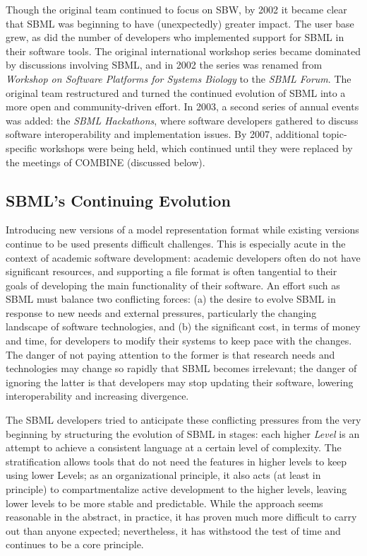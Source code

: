 Though the original team continued to focus on SBW, by 2002 it became clear that SBML was beginning to have (unexpectedly) greater impact.  The user base grew, as did the number of developers who implemented support for SBML in their software tools.  The original international workshop series became dominated by discussions involving SBML, and in 2002 the series was renamed from \emph{Workshop on Software Platforms for Systems Biology} to the \emph{SBML Forum}.  The original team restructured and turned the continued evolution of SBML into a more open and community-driven effort.  In 2003, a second series of annual events was added: the \emph{SBML Hackathons}, where software developers gathered to discuss software interoperability and implementation issues.  By 2007, additional topic-specific workshops were being held, which continued until they were replaced by the meetings of COMBINE (discussed below).
  

\subsection{SBML's Continuing Evolution}

Introducing new versions of a model representation format while existing versions continue to be used presents difficult challenges.  This is especially acute in the context of academic software development: academic developers often do not have significant resources, and supporting a file format is often tangential to their goals of developing the main functionality of their software.  An effort such as SBML must balance two conflicting forces: (a) the desire to evolve SBML in response to new needs and external pressures, particularly the changing landscape of software technologies, and (b) the significant cost, in terms of money and time, for developers to modify their systems to keep pace with the changes.  The danger of not paying attention to the former is that research needs and technologies may change so rapidly that SBML becomes irrelevant; the danger of ignoring the latter is that developers may stop updating their software, lowering interoperability and increasing divergence.

The SBML developers tried to anticipate these conflicting pressures from the very beginning by structuring the evolution of SBML in stages: each higher \emph{Level} is an attempt to achieve a consistent language at a certain level of complexity.  The stratification allows tools that do not need the features in higher levels to keep using lower Levels; as an organizational principle, it also acts (at least in principle) to compartmentalize active development to the higher levels, leaving lower levels to be more stable and predictable.  While the approach seems reasonable in the abstract, in practice, it has proven much more difficult to carry out than anyone expected; nevertheless, it has withstood the test of time and continues to be a core principle.

